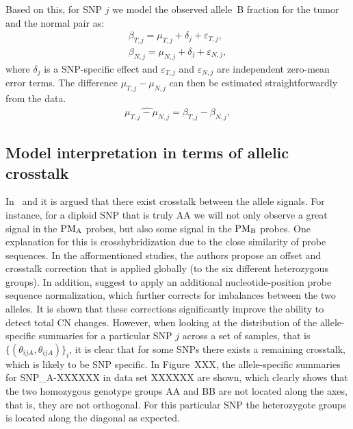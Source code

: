 \documentclass[10pt]{bmc_article}
\newenvironment{bmcformat}{\fussy\setboolean{publ}{true}}{\fussy}
\newcommand{\PMA}{\ensuremath{\textnormal{PM}_\textnormal{A}}\xspace}
\newcommand{\PMB}{\ensuremath{\textnormal{PM}_\textnormal{B}}\xspace}
\newcommand{\eps}{\varepsilon\xspace}
\newenvironment{TODO}{\color{red}\textbf{TODO:}}{}
\begin{document}
\begin{bmcformat}
Based on this, for SNP $j$ we model the observed allele~B fraction for the tumor and the normal pair as:
\begin{eqnarray}
  \beta_{T,j} = \mu_{T,j} + \delta_{j} + \eps_{T,j},\\
  \beta_{N,j} = \mu_{N,j} + \delta_{j} + \eps_{N,j},
  \label{eqnFracBModel}
\end{eqnarray}
where $\delta_{j}$ is a SNP-specific effect and $\eps_{T,j}$ and $\eps_{N,j}$ are independent zero-mean error terms. The difference $\mu_{T,j}-\mu_{N,j}$ can then be estimated straightforwardly from the data.
\begin{eqnarray}
  \widehat{\mu_{T,j}-\mu_{N,j}} = \beta_{T,j} - \beta_{N,j},
  \label{eqnTumorBoostEstimate}
\end{eqnarray}


\subsection*{Model interpretation in terms of allelic crosstalk}
\label{secACCModel}
In~\cite{BengtssonH_etal_2008} and \cite{BengtssonH_etal_2009b} it is argued that there exist crosstalk between the allele signals.  For instance, for a diploid SNP that is truly AA we will not only observe a great signal in the \PMA probes, but also some signal in the \PMB probes.  One explanation for this is crosshybridization due to the close similarity of probe sequences.  In the afformentioned studies, the authors propose an offset and crosstalk correction that is applied globally (to the six different heterozygous groups).  In addition, \cite{BengtssonH_etal_2009b} suggest to apply an additional nucleotide-position probe sequence normalization, which further corrects for imbalances between the two alleles.  It is shown that these corrections significantly improve the ability to detect total CN changes.
However, when looking at the distribution of the allele-specific summaries for a particular SNP $j$ across a set of samples, that is $\{(\theta_{ijA},\theta_{ijA})\}_i$, it is clear that for some SNPs there exists a remaining crosstalk, which is likely to be SNP specific.  In Figure~XXX, the allele-specific summaries for SNP\_A-XXXXXX in data set XXXXXX are shown, which clearly shows that the two homozygous genotype groups AA and BB are not located along the axes, that is, they are not orthogonal. For this particular SNP the heterozygote groups is located along the diagonal as expected.


\end{bmcformat}
\end{document}
